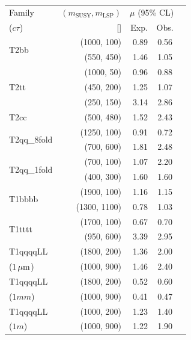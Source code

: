 \clearpage
\begin{table}
  \label{tab:benchmarks_aux}
  \centering
    \begin{tabular}{ lrrcc }
      \hline
      Family
      & $(m_{\text{SUSY}}, m_{\mathrm{LSP}})$
      & \multicolumn{2}{c}{$\mu$ (95\% CL)}                                                                            \\ [0.3ex]
      ($c\tau$)
      & [\GeVns{}]
      & Exp.
      & Obs.                                                                                                           \\ [0.3ex]
      \hline
      \multirow{2}{*}{T2bb} & (1000, 100) & 0.89 & 0.56 \\ & (550, 450)  & 1.46 & 1.05 \\ [0.5ex]
      \multirow{3}{*}{T2tt} & (1000, 50)  & 0.96 & 0.88 \\ & (450, 200)  & 1.25 & 1.07 \\ & (250, 150)  & 3.14 & 2.86 \\ [0.5ex]
      \multirow{1}{*}{T2cc} & (500, 480)  & 1.52 & 2.43 \\ [0.5ex]
      \multirow{2}{*}{T2qq\_8fold} & (1250, 100) & 0.91 & 0.72 \\ & (700, 600)  & 1.81 & 2.48 \\ [0.5ex]
      \multirow{2}{*}{T2qq\_1fold} & (700, 100)  & 1.07 & 2.20 \\ & (400, 300)  & 1.60 & 1.60 \\ [0.5ex]
      \multirow{2}{*}{T1bbbb} & (1900, 100) & 1.16 & 1.15 \\ & (1300, 1100) & 0.78 & 1.03 \\ [0.5ex]
      \multirow{2}{*}{T1tttt} & (1700, 100) & 0.67 & 0.70 \\ & (950, 600)  & 3.39 & 2.95 \\ [0.5ex]
	    T1qqqqLL & (1800, 200) & 1.36 & 2.00 \\ ($1\,{\mu}\text{m}$) & (1000, 900) & 1.46 & 2.40 \\ [0.5ex]
      T1qqqqLL & (1800, 200) & 0.52 & 0.60 \\ ($1\unit{mm}$) & (1000, 900) & 0.41 & 0.47 \\ [0.5ex]
      T1qqqqLL & (1000, 200) & 1.23 & 1.40 \\ ($1\unit{m}$) & (1000, 900) & 1.22 & 1.90 \\
      \hline
    \end{tabular}
\end{table}

